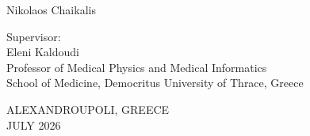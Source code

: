\begin{titlepage}
\begin{center}
\vspace{0.3cm}

{\large Nikolaos Chaikalis\par}

\vspace{0.4cm}

{\large Supervisor:\\
Eleni Kaldoudi\\
Professor of Medical Physics and Medical Informatics\\
School of Medicine, Democritus University of Thrace, Greece\par}

\vspace{0.3cm}

\vfill

{\large ALEXANDROUPOLI, GREECE\\
JULY 2026\par}

\end{center}
\end{titlepage}

